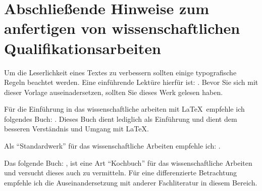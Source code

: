 \section{Abschließende Hinweise zum anfertigen von wissenschaftlichen Qualifikationsarbeiten}\label{sec:hinweise-wiss-arbeiten}

 Um die Leserlichkeit eines Textes zu verbessern sollten einige typografische Regeln beachtet werden. Eine einführende Lektüre hierfür ist: . Bevor Sie sich mit dieser Vorlage auseinadersetzen, sollten Sie dieses Werk gelesen haben.
 
 Für die Einführung in das wissenschaftliche arbeiten mit \LaTeX\ empfehle ich folgendes Buch: . Dieses Buch dient lediglich als Einführung und dient dem besseren Verständnis und Umgang mit \LaTeX.
 
 Als \enquote{Standardwerk} für das wissenschaftliche Arbeiten empfehle ich: .

Das folgende Buch: , ist eine Art \enquote{Kochbuch} für das wissenschaftliche Arbeiten und versucht dieses auch zu vermitteln. Für eine differenzierte Betrachtung empfehle ich die Auseinandersetzung mit anderer Fachliteratur in diesem Bereich.

